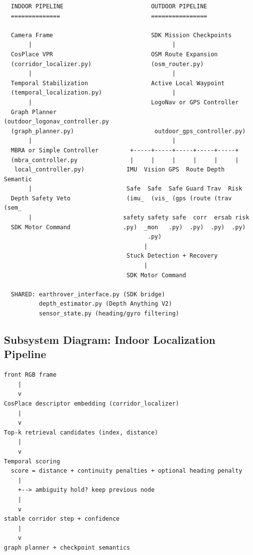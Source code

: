 \documentclass[11pt]{article}
\begin{document}
\begin{lstlisting}
  INDOOR PIPELINE                         OUTDOOR PIPELINE
  ==============                          ================

  Camera Frame                            SDK Mission Checkpoints
       |                                        |
  CosPlace VPR                            OSM Route Expansion
  (corridor_localizer.py)                 (osm_router.py)
       |                                        |
  Temporal Stabilization                  Active Local Waypoint
  (temporal_localization.py)                    |
       |                                  LogoNav or GPS Controller
  Graph Planner                           (outdoor_logonav_controller.py
  (graph_planner.py)                       outdoor_gps_controller.py)
       |                                        |
  MBRA or Simple Controller         +-----+-----+-----+-----+-----+
  (mbra_controller.py               |     |     |     |     |     |
   local_controller.py)            IMU  Vision GPS  Route Depth Semantic
       |                           Safe  Safe  Safe Guard Trav  Risk
  Depth Safety Veto                (imu_  (vis_ (gps (route (trav (sem_
       |                          safety safety safe  corr  ersab risk
  SDK Motor Command               .py)  _mon   .py)  .py)  .py)  .py)
                                         .py)
                                        |
                                   Stuck Detection + Recovery
                                        |
                                   SDK Motor Command

  SHARED: earthrover_interface.py (SDK bridge)
          depth_estimator.py (Depth Anything V2)
          sensor_state.py (heading/gyro filtering)
\end{lstlisting}

\subsection{Subsystem Diagram: Indoor Localization Pipeline}

\begin{lstlisting}
front RGB frame
    |
    v
CosPlace descriptor embedding (corridor_localizer)
    |
    v
Top-k retrieval candidates (index, distance)
    |
    v
Temporal scoring
  score = distance + continuity penalties + optional heading penalty
    |
    +--> ambiguity hold? keep previous node
    |
    v
stable corridor step + confidence
    |
    v
graph planner + checkpoint semantics
\end{lstlisting}
\end{document}
